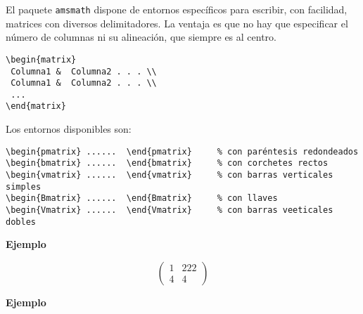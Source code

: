 \documentclass[11pt,a4paper]{report}
\begin{document}
\bigskip





El paquete \texttt{amsmath} dispone de entornos específicos para escribir, con facilidad, matrices con diversos delimitadores. La ventaja es que no hay que especificar el número de columnas ni su alineación, que siempre es al centro.
%
\begin{verbatim}
\begin{matrix}
 Columna1 &  Columna2 . . . \\
 Columna1 &  Columna2 . . . \\
 ...
\end{matrix}
\end{verbatim}
%
Los entornos disponibles son:
%
\begin{verbatim}
\begin{pmatrix} ......  \end{pmatrix}     % con paréntesis redondeados
\begin{bmatrix} ......  \end{bmatrix}     % con corchetes rectos
\begin{vmatrix} ......  \end{vmatrix}     % con barras verticales simples
\begin{Bmatrix} ......  \end{Bmatrix}     % con llaves
\begin{Vmatrix} ......  \end{Vmatrix}     % con barras veeticales dobles
\end{verbatim}
%





\bigskip
\textbf{Ejemplo}

\begin{equation*}
\begin{pmatrix}
1 & 222 \\ 4 & 4
\end{pmatrix}
\end{equation*}

\bigskip





\bigskip
\textbf{Ejemplo}
\end{document}
